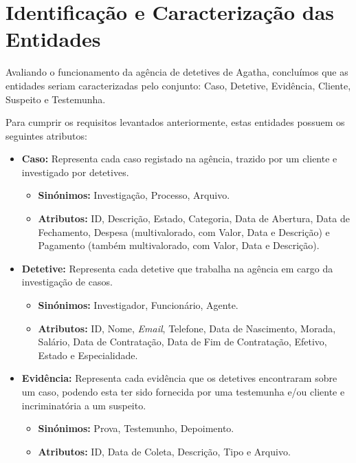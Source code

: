 \documentclass[a4paper,12pt]{scrreprt}
\begin{document}
    \clearpage
        
    \section{Identificação e Caracterização das Entidades}
        Avaliando o funcionamento da agência de detetives de Agatha, concluímos que as entidades seriam caracterizadas pelo conjunto: Caso, Detetive, Evidência, Cliente, Suspeito e Testemunha.

        Para cumprir os requisitos levantados anteriormente, estas entidades possuem os seguintes atributos:

        \begin{itemize}
        \item \textbf{Caso:} Representa cada caso registado na agência, trazido por um cliente e investigado por detetives.
            \begin{itemize}
            \item\textbf{Sinónimos:} Investigação, Processo, Arquivo. 
            \item\textbf{Atributos:} ID, Descrição, Estado, Categoria, Data de Abertura, Data de Fechamento, Despesa (multivalorado, com Valor, Data e Descrição) e Pagamento (também multivalorado, com Valor, Data e Descrição).
            \end{itemize}

        \item \textbf{Detetive:} Representa cada detetive que trabalha na agência em cargo da investigação de casos.
            \begin{itemize}
            \item\textbf{Sinónimos:} Investigador, Funcionário, Agente.
            \item\textbf{Atributos:} ID, Nome, \textit{Email}, Telefone, Data de Nascimento, Morada, Salário, Data de Contratação, Data de Fim de Contratação, Efetivo, Estado e Especialidade.
            \end{itemize}

        \item \textbf{Evidência:} Representa cada evidência que os detetives encontraram sobre um caso, podendo esta ter sido fornecida por uma testemunha e/ou cliente e incriminatória a um suspeito.
            \begin{itemize}
            \item\textbf{Sinónimos:} Prova, Testemunho, Depoimento. 
            \item\textbf{Atributos:} ID, Data de Coleta, Descrição, Tipo e Arquivo.
            \end{itemize}


\end{itemize}
\end{document}
